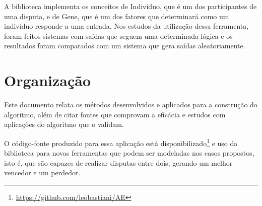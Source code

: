 A biblioteca implementa os conceitos de Indivíduo, que é um dos participantes de uma disputa, e de Gene, que é um dos fatores que determinará como um indivíduo responde a uma entrada. Nos estudos da utilização dessa ferramenta, foram feitos sistemas com saídas que seguem uma determinada lógica e os resultados foram comparados com um sistema que gera saídas aleatoriamente.

\section{Organização}

Este documento relata os métodos desenvolvidos e aplicados para a construção do algoritmo, além de citar fontes que comprovam a eficácia e estudos com aplicações do algoritmo que o validam.

O código-fonte produzido para essa aplicação está disponibilizado\footnote{\url{https://github.com/leobastiani/AE}} e uso da biblioteca para novas ferramentas que podem ser modeladas nos casos propostos, isto é, que são capazes de realizar disputas entre dois, gerando um melhor vencedor e um perdedor.
